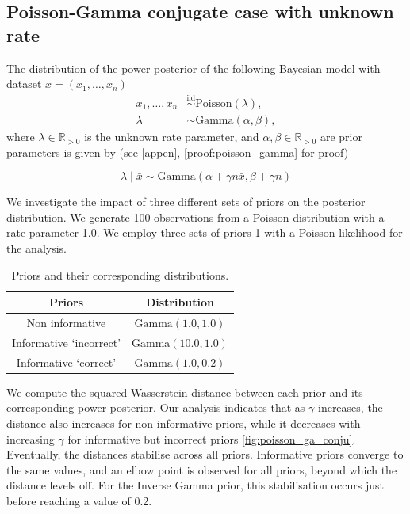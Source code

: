 \documentclass[12pt]{article}
\begin{document}
\subsection{Poisson-Gamma conjugate case with unknown rate}

The distribution of the power posterior of the following Bayesian model with
dataset $x = (x_1, \ldots, x_n)$ 
\begin{subequations}
\begin{align}
x_1, \ldots, x_n &\overset{\mathrm{iid}}{\sim} \text{Poisson}(\lambda), \\
\lambda &\sim \text{Gamma}(\alpha, \beta),
\end{align}
\end{subequations}
where $\lambda \in \mathbb{R}_{>0}$ is the unknown rate parameter, and $\alpha,
\beta \in \mathbb{R}_{>0}$ are prior parameters is given by (see \cref{appen}, \cref{proof:poisson_gamma} for proof)

\begin{equation}
\lambda \; | \; \bar{x} \sim \text{Gamma} \left( \alpha + \gamma n \bar{x}, \beta + \gamma n \right)
\end{equation}

We investigate the impact of three different sets of priors on the posterior distribution. We generate 100 observations from a Poisson distribution with a rate parameter 1.0. We employ three sets of priors \cref{priors_gammaPois} with a Poisson likelihood for the analysis. 
\begin{table}[h!]
	\caption{Priors and their corresponding distributions.}
	\renewcommand{\arraystretch}{1.5}
	\centering
	\begin{tabular}{cc}
		\toprule
		Priors                   & Distribution\\
		\midrule
		Non informative                    &  $\text{Gamma}(1.0, 1.0)$\\
		Informative `incorrect'         & $\text{Gamma}(10.0, 1.0)$\\
		Informative    `correct'               & $\text{Gamma}(1.0, 0.2)$\\
		\bottomrule
	\end{tabular}
	\label{priors_gammaPois}
\end{table}


We compute the squared Wasserstein distance between each prior and its corresponding power posterior. Our analysis indicates that as $\gamma$ increases, the distance also increases for non-informative priors, while it decreases with increasing $\gamma$ for informative but incorrect priors \cref{fig:poisson_ga_conju}. Eventually, the distances stabilise across all priors. Informative priors converge to the same values, and an elbow point is observed for all priors, beyond which the distance levels off. For the Inverse Gamma prior, this stabilisation occurs just before reaching a value of 0.2.
\end{document}
